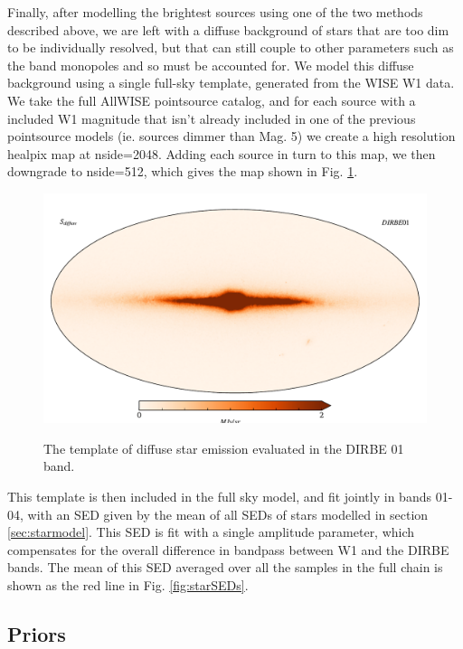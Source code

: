 \documentclass{aa}
\begin{document}
Finally, after modelling the brightest sources using one of the two methods described above, we are left with a diffuse background of stars that are too dim to be individually resolved, but that can still couple to other parameters such as the band monopoles and so must be accounted for. We model this diffuse background using a single full-sky template, generated from the WISE W1 data. We take the full AllWISE pointsource catalog, and for each source with a included W1 magnitude that isn't already included in one of the previous pointsource models (ie. sources dimmer than Mag. 5) we create a high resolution healpix map \citep{healpix} at nside=2048. Adding each source in turn to this map, we then downgrade to nside=512, which gives the map shown in Fig. \ref{fig:diffuse}. 

\begin{figure}
  \centering
  \includegraphics[width=\columnwidth]{figs/diffuseTemplate/diffuse_stars.pdf}\\
  \caption{The template of diffuse star emission evaluated in the DIRBE 01 band.}
  \label{fig:diffuse}
\end{figure}

This template is then included in the full sky model, and fit jointly in bands 01-04, with an SED given by the mean of all SEDs of stars modelled in section \ref{sec:starmodel}. This SED is fit with a single amplitude parameter, which compensates for the overall difference in bandpass between W1 and the DIRBE bands. The mean of this SED averaged over all the samples in the full chain is shown as the red line in Fig. \ref{fig:starSEDs}.

\subsection{Priors}
\end{document}
